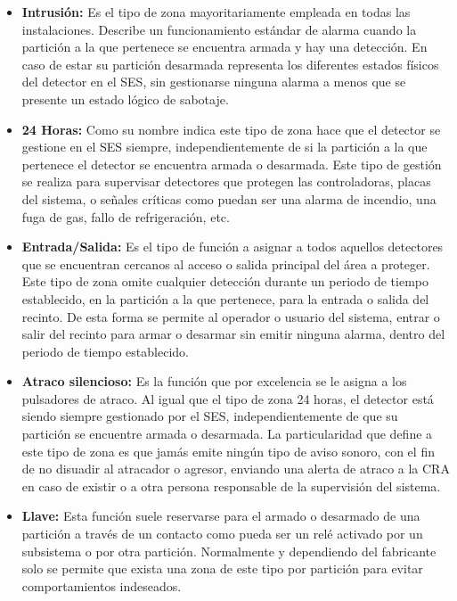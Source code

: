 \begin{itemize}
\item \textbf{Intrusión:} Es el tipo de zona mayoritariamente empleada en todas las instalaciones. Describe un funcionamiento estándar de alarma cuando la partición a la que pertenece se encuentra armada y hay una detección. En caso de estar su partición desarmada representa los diferentes estados físicos del detector en el \acs{SES}, sin gestionarse ninguna alarma a menos  que se presente un estado lógico de sabotaje.
\item \textbf{24 Horas:} Como su nombre  indica este tipo de zona hace
  que   el   detector   se   gestione   en   el   \acs{SES}   siempre,
  independientemente de si la partición a la que pertenece el detector
  se encuentra  armada o  desarmada. Este tipo  de gestión  se realiza
  para supervisar  detectores que protegen las  controladoras, placas
  del  sistema, o  señales  críticas  como puedan  ser  una alarma  de
  incendio, una fuga de gas, fallo de refrigeración, etc.
\item \textbf{Entrada/Salida:} Es el tipo de función a asignar a todos aquellos detectores que se encuentran cercanos al acceso o salida principal del área a proteger. Este tipo de zona omite cualquier detección durante un periodo de tiempo establecido, en la partición a la que pertenece, para la entrada o salida del recinto. De esta forma se permite al operador o usuario del sistema, entrar o salir del recinto para armar o desarmar sin emitir ninguna alarma,  dentro del periodo de tiempo establecido.
\item \textbf{Atraco silencioso:} Es la función que por excelencia se le asigna a los pulsadores de atraco. Al igual que el tipo de zona 24 horas, el detector está siendo siempre gestionado por el \acs{SES}, independientemente de que su partición se encuentre armada o desarmada. La particularidad que define a este tipo de zona es que jamás emite ningún tipo de aviso sonoro, con el fin de no disuadir al atracador o agresor, enviando una alerta de atraco a la \acf{CRA} en caso de existir o a otra persona responsable de la supervisión del sistema.
\item \textbf{Llave:} Esta función suele reservarse para el armado o desarmado de una partición a través de un contacto como pueda ser un relé activado por un subsistema o por otra partición. Normalmente y dependiendo del fabricante solo se permite que exista una zona de este tipo por partición para evitar comportamientos indeseados.
\end{itemize}

